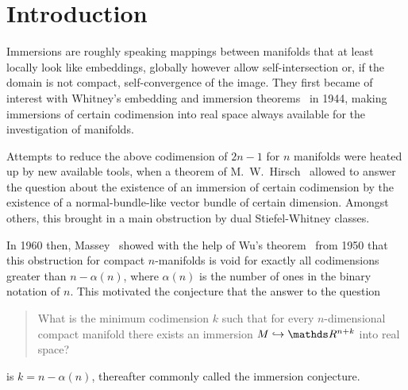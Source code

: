 % 

\chapter*{Introduction} %


Immersions are roughly speaking mappings between
manifolds that at least locally look like embeddings, globally however
allow self-intersection or, if the domain is not compact,
self-convergence of the image.
They first became of interest with Whitney's embedding and immersion
theorems~\cite{whitneyimmersiontheorem} in 1944, making immersions
of certain codimension into real space always available for the
investigation of manifolds.

Attempts to reduce the above codimension of $2n-1$ for $n$ manifolds
were heated up by new available tools, when a theorem of
M.~W.~Hirsch~\cite{hirschimmersions} allowed to answer the question
about the existence of an immersion of certain codimension by the
existence of a normal-bundle-like vector bundle of certain dimension.
Amongst others, this brought in a main obstruction by dual
Stiefel-Whitney classes.

In 1960 then, Massey~\cite{massey} showed with the help of Wu's
theorem~\cite{wu} from 1950 that this obstruction for compact
$n$-manifolds is void for exactly all codimensions greater than
$n-\alpha(n)$, where $\alpha(n)$ is the number of ones in the binary
notation of $n$.
This motivated the conjecture that the answer to the question
\begin{quote}
    What is the minimum codimension $k$ such that for every
    $n$-dimensional compact manifold there exists an
    immersion $M\immto\R^{n+k}$ into real space?
\end{quote}
is $k=n-\alpha(n)$, thereafter commonly called the immersion
conjecture.

